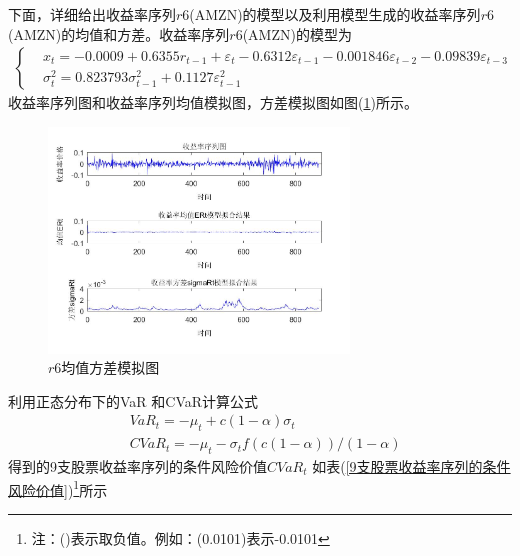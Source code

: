         下面，详细给出收益率序列$r6$(AMZN)的模型以及利用模型生成的收益率序列$r6$(AMZN)的均值和方差。收益率序列$r6$(AMZN)的模型为
        \begin{align*}
        \left\{
        \begin{aligned}
        & x_t = -0.0009+0.6355r_{t-1}+\varepsilon_t-0.6312\varepsilon_{t-1}-0.001846\varepsilon_{t-2}-0.09839\varepsilon_{t-3}\\
        & \sigma_t^2 = 0.823793\sigma_{t-1}^2+0.1127\varepsilon_{t-1}^2
        \end{aligned}
        \right.
        \end{align*}
        收益率序列图和收益率序列均值模拟图，方差模拟图如图(\ref{r6均值方差模拟图})所示。
        \begin{figure}[H]
        \centering
        \includegraphics[width= 8cm]{images/r6_mu_sigma.jpg}
        \caption{$r6$均值方差模拟图}
        \label{r6均值方差模拟图}
        \end{figure}
        \par
        利用正态分布下的VaR 和CVaR计算公式
        \begin{align*}
        & VaR_t = -\mu_t + c(1-\alpha)\sigma_t\\
        & CVaR_t = -\mu_t-\sigma_tf(c(1-\alpha))/(1-\alpha)
        \end{align*}
        得到的9支股票收益率序列的条件风险价值$CVaR_t$ 如表(\ref{9支股票收益率序列的条件风险价值})\footnote{注：()表示取负值。例如：(0.0101)表示-0.0101}所示
